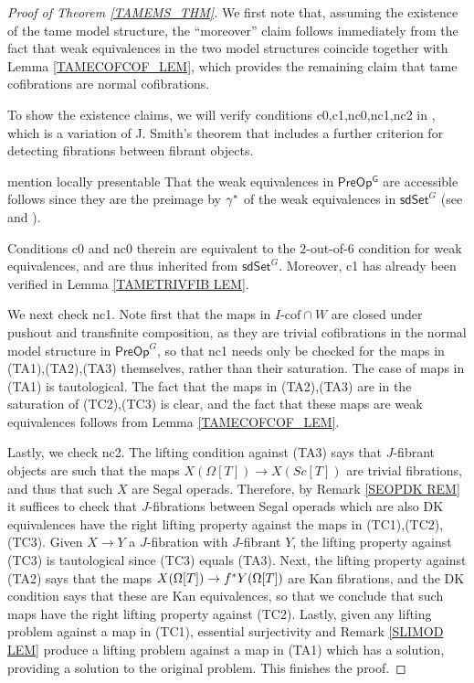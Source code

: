 \documentclass[a4paper,10pt
,draft
]{article}%
\numberwithin{equation}{section}
\numberwithin{figure}{section}
\theoremstyle{definition} %
\newcommand{\1}{\ensuremath{\mathbbm 1}}%
\begin{document}
\begin{proof}[Proof of Theorem \ref{TAMEMS_THM}]
	We first note that, assuming the existence of the tame model structure,
	the ``moreover'' claim
	follows immediately from the fact that weak equivalences in the two model structures coincide together with  
	Lemma \ref{TAMECOFCOF_LEM},
	which provides the remaining claim that tame cofibrations are normal cofibrations.
	
	To show the existence claims, we will verify conditions c0,c1,nc0,nc1,nc2 in  
	\cite[Prop. 1.3]{Sta14},
	which is a variation of 
	J. Smith's theorem \cite[Thm. 1.7]{Bek00}
	that includes a further criterion for detecting 
	fibrations between fibrant objects.

	{\color{blue} mention locally presentable}
	That the weak equivalences in $\mathsf{PreOp^G}$ are accessible follows since they are the preimage by $\gamma^{\**}$ of the weak equivalences in 
	$\mathsf{sdSet}^G$ 
	(see \cite[Cor. A.2.6.5]{Lur09} and \cite[Cor. A.2.6.6]{Lur09}).

	
	Conditions c0 and nc0 therein are equivalent to the $2$-out-of-$6$
	condition for weak equivalences, and are thus inherited 
	from $\mathsf{sdSet}^G$.
	Moreover, c1 has already been verified in Lemma \ref{TAMETRIVFIB LEM}. 

We next check nc1. 
Note first that the maps in $I\text{-cof} \cap W$
are closed under pushout and transfinite composition, as they are trivial cofibrations in the normal model structure in 
$\mathsf{PreOp}^G$,
so that nc1 needs only be checked for the maps in (TA1),(TA2),(TA3) themselves, rather than their saturation.
The case of maps in (TA1) is tautological.
The fact that the maps in 
(TA2),(TA3) are in the saturation of (TC2),(TC3) is clear, and the fact that these maps are weak equivalences follows from 
Lemma \ref{TAMECOFCOF_LEM}.

	
Lastly, we check nc2.
The lifting condition against (TA3) says that $J$-fibrant objects are such that the maps $X(\Omega[T]) \to X(Sc[T])$
are trivial fibrations, and thus that such $X$ are Segal operads.
Therefore, by Remark \ref{SEOPDK REM} it suffices to check that $J$-fibrations between Segal operads which are also DK equivalences have the right lifting property against the maps in (TC1),(TC2),(TC3).
Given $X \to Y$ a $J$-fibration with $J$-fibrant $Y$,
the lifting property against (TC3) is tautological since 
(TC3) equals (TA3).
Next, the lifting property against (TA2) says that the maps
$X(\Omega[T]) \to f^{\**} Y(\Omega[T])$
are Kan fibrations, and the DK condition says that these are Kan equivalences,
so that we conclude that such maps have the right lifting property against (TC2).
Lastly, given any lifting problem against a map in (TC1),
essential surjectivity and Remark \ref{SLIMOD LEM}
produce a lifting problem against a map in (TA1) which has a solution, providing a solution to the original problem.
%
This finishes the proof.	
\end{proof}
\end{document}
